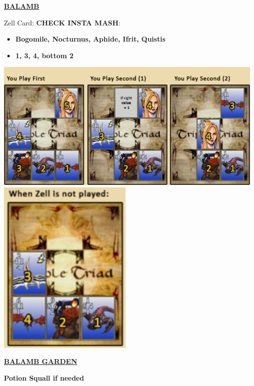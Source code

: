 \underline{\textbf{BALAMB}}

Zell Card: \textbf{CHECK INSTA MASH}:
\begin{itemize}
	\item \textbf{Bogomile, Nocturnus, Aphide, Ifrit, Quistis}
	\item \textbf{1, 3, 4, bottom 2}
\end{itemize}

\includegraphics[scale=0.45]{Images/zc_win.png}
\includegraphics[scale=0.5]{Images/zc_notplayed.png}

\underline{\textbf{BALAMB GARDEN}}

\textbf{Potion Squall if needed}

